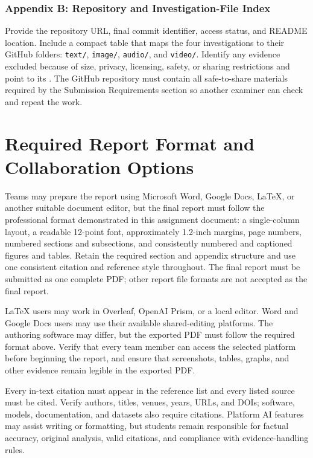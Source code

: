 \documentclass[12pt,letterpaper]{article}
\begin{document}
\subsubsection{Appendix B: Repository and Investigation-File Index}
Provide the repository URL, final commit identifier, access status, and README location. Include a compact table that maps the four investigations to their GitHub folders: \texttt{text/}, \texttt{image/}, \texttt{audio/}, and \texttt{video/}. Identify any evidence excluded because of size, privacy, licensing, safety, or sharing restrictions and point to its . The GitHub repository must contain all safe-to-share materials required by the Submission Requirements section so another examiner can check and repeat the work.

\section{Required Report Format and Collaboration Options}
Teams may prepare the report using Microsoft Word, Google Docs, LaTeX, or another suitable document editor, but the final report must follow the professional format demonstrated in this assignment document: a single-column layout, a readable 12-point font, approximately 1.2-inch margins, page numbers, numbered sections and subsections, and consistently numbered and captioned figures and tables. Retain the required section and appendix structure and use one consistent citation and reference style throughout. The final report must be submitted as one complete PDF; other report file formats are not accepted as the final report.

LaTeX users may work in Overleaf, OpenAI Prism, or a local editor. Word and Google Docs users may use their available shared-editing platforms. The authoring software may differ, but the exported PDF must follow the required format above. Verify that every team member can access the selected platform before beginning the report, and ensure that screenshots, tables, graphs, and other evidence remain legible in the exported PDF.

Every in-text citation must appear in the reference list and every listed source must be cited. Verify authors, titles, venues, years, URLs, and DOIs; software, models, documentation, and datasets also require citations. Platform AI features may assist writing or formatting, but students remain responsible for factual accuracy, original analysis, valid citations, and compliance with evidence-handling rules.
\end{document}
